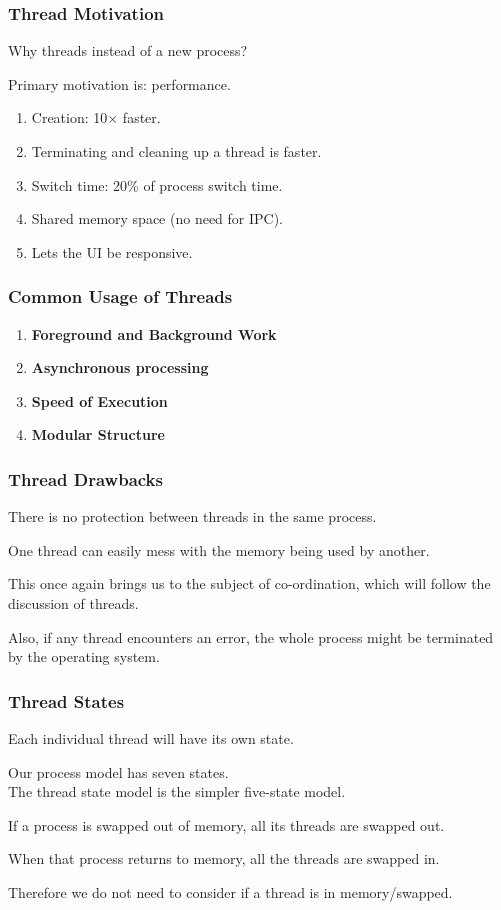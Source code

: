 \begin{frame}
	\frametitle{Thread Motivation}
	Why threads instead of a new process?

	Primary motivation is: performance.

	\begin{enumerate}
		\item Creation: 10$\times$ faster.
		\item Terminating and cleaning up a thread is faster.
		\item Switch time: 20\% of process switch time.
		\item Shared memory space (no need for IPC).
		\item Lets the UI be responsive.
	\end{enumerate}

\end{frame}

\begin{frame}
	\frametitle{Common Usage of Threads}

	\begin{enumerate}
		\item \textbf{Foreground and Background Work}
		\item \textbf{Asynchronous processing}
		\item \textbf{Speed of Execution}
		\item \textbf{Modular Structure}
	\end{enumerate}

\end{frame}

\begin{frame}
	\frametitle{Thread Drawbacks}

	There is no protection between threads in the same process.

	One thread can easily mess with the memory being used by another.

	This once again brings us to the subject of co-ordination, which will follow the discussion of threads.

	Also, if any thread encounters an error, the whole process might be terminated by the operating system.

\end{frame}

\begin{frame}
	\frametitle{Thread States}
	Each individual thread will have its own state.

	Our process model has seven states.\\
	\quad The thread state model is the simpler five-state model.

	If a process is swapped out of memory, all its threads are swapped out.

	When that process returns to memory, all the threads are swapped in.

	Therefore we do not need to consider if a thread is in memory/swapped.

\end{frame}

